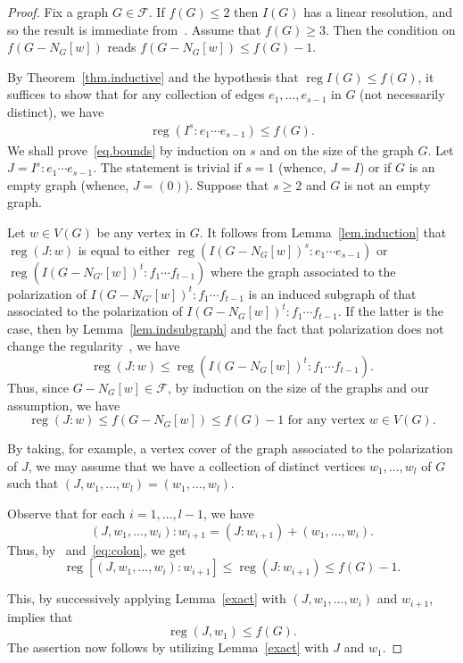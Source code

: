 \documentclass[10pt]{amsart}
\theoremstyle{definition}
\DeclareMathOperator{\reg}{reg}
\newcommand{\F}{\mathcal{F}}
\begin{document}
\begin{proof} Fix a graph $G \in \F.$ If $f(G) \le 2$ then $I(G)$ has a linear resolution, and so the result is immediate from~\cite[Theorem 3.2]{HHZ}. Assume that $f(G) \ge 3$. Then the condition on $f(G - N_G[w])$ reads $f(G-N_G[w]) \le f(G)-1.$

By Theorem~\ref{thm.inductive} and the hypothesis that $\reg I(G) \le f(G)$, it suffices to show that for any collection of edges $e_1, \dots, e_{s-1}$ in $G$ (not necessarily distinct), we have
\begin{align}
\reg (I^s : e_1 \cdots e_{s-1}) \le f(G). \label{eq.bounds}
\end{align}
We shall prove~\eqref{eq.bounds} by induction on $s$ and on the size of the graph $G$. Let $J = I^s : e_1 \cdots e_{s-1}$. The statement is trivial if $s = 1$ (whence, $J = I$) or if $G$ is an empty graph (whence, $J = (0)$). Suppose that $s \ge 2$ and $G$ is not an empty graph.

Let $w \in V(G)$ be any vertex in $G$. It follows from Lemma~\ref{lem.induction} that $\reg (J:w)$ is equal to either $\reg (I(G - N_G[w])^s : e_1 \cdots e_{s-1})$ or $\reg (I(G - N_{G'}[w])^t : f_1 \cdots f_{t-1})$ where the graph associated to the polarization of $I(G-N_{G'}[w])^t : f_1 \cdots f_{t-1}$ is an induced subgraph of that associated to the polarization of $I(G-N_G[w])^t : f_1 \cdots f_{t-1}$. If the latter is the case, then by Lemma~\ref{lem.indsubgraph} and the fact that polarization does not change the regularity~\cite[Corollary 1.6.3]{HH}, we have 
\[
\reg (J:w) \le \reg (I(G-N_G[w])^t : f_1 \cdots f_{t-1}).
\]
Thus, since $G-N_G[w] \in \F$, by induction on the size of the graphs and our assumption, we have
\begin{equation}\label{eq:colon}
\reg (J:w) \le f(G-N_G[w]) \le f(G)-1 \text{ for any vertex } w \in V(G).
\end{equation}

By taking, for example, a vertex cover of the graph associated to the polarization of $J$, we may assume that we have a collection of distinct vertices $w_1, \dots, w_l$ of $G$ such that $(J,w_1, \dots, w_l) = (w_1, \dots, w_l)$.

Observe that for each $i = 1, \dots, l-1$, we have
\[
(J,w_1, \dots, w_i):w_{i+1} = (J:w_{i+1}) + (w_1, \dots, w_{i}).
\]
Thus, by~\cite[Corollary 3.2]{Herzog} and~\eqref{eq:colon}, we get
\[
\reg [(J,w_1, \dots, w_i):w_{i+1}] \le \reg (J:w_{i+1}) \le f(G)-1.
\]

This, by successively applying Lemma~\ref{exact} with $(J, w_1, \dots, w_i)$ and $w_{i+1}$, implies that
\[
\reg (J,w_1) \le f(G).
\]
The assertion now follows by utilizing Lemma~\ref{exact} with $J$ and $w_1$.
\end{proof}
\end{document}
